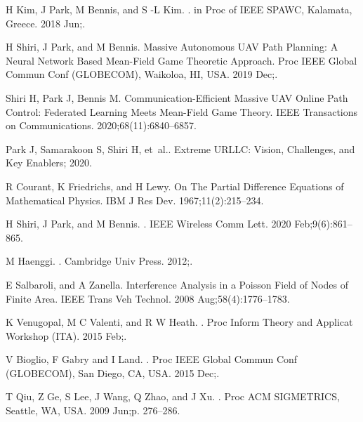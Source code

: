 \documentclass{book}
\begin{document}
\begin{thebibliography}{10}
  {H  Kim, J  Park, M  Bennis, and S -L  Kim}.
  .
  \newblock in Proc of IEEE SPAWC, Kalamata, Greece. 2018 Jun;.
  
  {H  Shiri, J  Park, and M  Bennis}.
  \newblock Massive Autonomous UAV Path Planning: A Neural Network Based
    Mean-Field Game Theoretic Approach.
  \newblock Proc IEEE Global Commun Conf (GLOBECOM), Waikoloa, HI, USA. 2019
    Dec;.
  
  {Shiri} H, {Park} J, {Bennis} M.
  \newblock Communication-Efficient Massive UAV Online Path Control: Federated
    Learning Meets Mean-Field Game Theory.
  \newblock IEEE Transactions on Communications. 2020;68(11):6840--6857.
  
  Park J, Samarakoon S, Shiri H, et~al.. Extreme URLLC: Vision, Challenges, and
    Key Enablers; 2020.
  
  {R  Courant, K  Friedrichs, and H  Lewy}.
  \newblock On The Partial Difference Equations of Mathematical Physics.
  \newblock IBM J Res Dev. 1967;11(2):215--234.
  
  {H  Shiri, J  Park, and M  Bennis}.
  .
  \newblock IEEE Wireless Comm Lett. 2020 Feb;9(6):861--865.
  
  {M  Haenggi}.
  .
  \newblock Cambridge Univ Press. 2012;.
  
  {E  Salbaroli, and A  Zanella}.
  \newblock Interference Analysis in a Poisson Field of Nodes of Finite Area.
  \newblock IEEE Trans Veh Technol. 2008 Aug;58(4):1776--1783.
  
  {K  Venugopal, M  C  Valenti, and R  W  Heath}.
  .
  \newblock Proc Inform Theory and Applicat Workshop (ITA). 2015 Feb;.
  
  {V  Bioglio, F  Gabry and I  Land}.
  .
  \newblock Proc IEEE Global Commun Conf (GLOBECOM), San Diego, CA, USA. 2015
    Dec;.
  
  {T  Qiu, Z  Ge, S  Lee, J  Wang, Q  Zhao, and J  Xu}.
  .
  \newblock Proc ACM SIGMETRICS, Seattle, WA, USA. 2009 Jun;p. 276--286.
  

\end{thebibliography}
\end{document}
